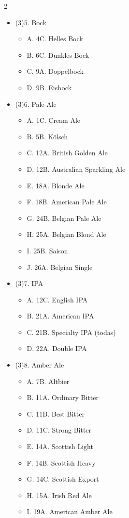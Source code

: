 \begin{multicols*}{2}
\begin{itemize}[noitemsep]
\begin{itemize}
\end{itemize}
\item[] (3)5. Bock
\begin{itemize}
  \item[] A. 4C. Helles Bock
  \item[] B. 6C. Dunkles Bock
  \item[] C. 9A. Doppelbock
  \item[] D. 9B. Eisbock
\end{itemize}
\item[] (3)6. Pale Ale
\begin{itemize}
  \item[] A. 1C. Cream Ale
  \item[] B. 5B. Kölsch
  \item[] C. 12A. British Golden Ale
  \item[] D. 12B. Australian Sparkling Ale
  \item[] E. 18A. Blonde Ale
  \item[] F. 18B. American Pale Ale
  \item[] G. 24B. Belgian Pale Ale
  \item[] H. 25A. Belgian Blond Ale
  \item[] I. 25B. Saison
  \item[] J. 26A. Belgian Single
\end{itemize}
\item[] (3)7. IPA
\begin{itemize}
  \item[] A. 12C. English IPA
  \item[] B. 21A. American IPA
  \item[] C. 21B. Specialty IPA (todas)
  \item[] D. 22A. Double IPA
\end{itemize}
\item[] (3)8. Amber Ale
\begin{itemize}
  \item[] A. 7B. Altbier
  \item[] B. 11A. Ordinary Bitter
  \item[] C. 11B. Best Bitter
  \item[] D. 11C. Strong Bitter
  \item[] E. 14A. Scottish Light
  \item[] F. 14B. Scottish Heavy
  \item[] G. 14C. Scottish Export
  \item[] H. 15A. Irish Red Ale
  \item[] I. 19A. American Amber Ale

\end{itemize}
\end{itemize}
\end{multicols*}
